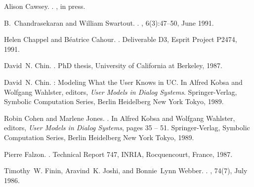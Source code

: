 \documentclass{kluwer}    %
\begin{document}
\begin{article}
\begin{thebibliography}{}
Alison Cawsey.
.
, in press.
                                                               
B.~Chandrasekaran and William Swartout.
.
, 6(3):47--50, June 1991.

Helen Chappel and B\'eatrice Cahour.
.
\newblock Deliverable D3, Esprit Project P2474, 1991.

David~N. Chin.
.
\newblock PhD thesis, University of California at Berkeley, 1987.

David~N. Chin.
: {M}odeling {W}hat the {U}ser {K}nows in {UC}.
\newblock In Alfred Kobsa and Wolfgang Wahlster, editors, {\em User Models in
  Dialog Systems}. Springer-Verlag, Symbolic Computation Series, Berlin
  Heidelberg New York Tokyo, 1989.

Robin Cohen and Marlene Jones.
.
\newblock In Alfred Kobsa and Wolfgang Wahlster, editors, {\em User Models in
  Dialog Systems}, pages 35 -- 51. Springer-Verlag, Symbolic Computation
  Series, Berlin Heidelberg New York Tokyo, 1989.

Pierre Falzon.
.
\newblock Technical Report 747, INRIA, Rocquencourt, France, 1987.

Timothy~W. Finin, Aravind~K. Joshi, and Bonnie~Lynn Webber.
.
, 74(7), July 1986.

\end{thebibliography}
\end{article}
\end{document}
